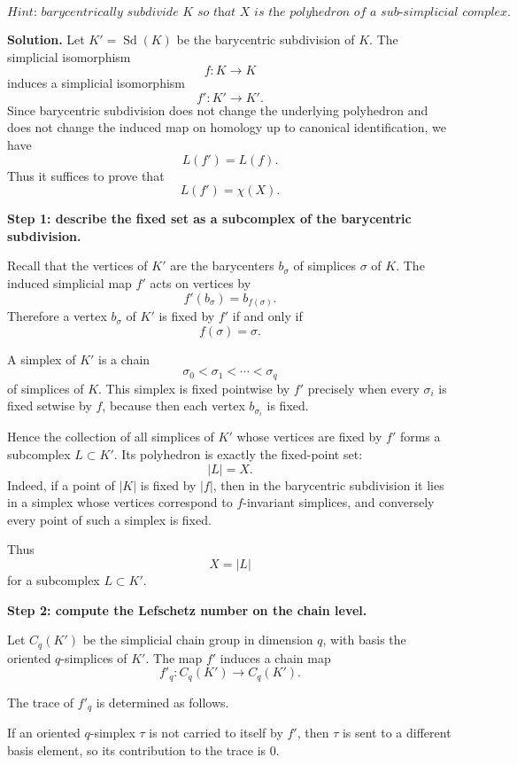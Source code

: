 \documentclass[12pt,a4paper]{article}
\theoremstyle{notespace}
\begin{document}
\[
\textit{Hint: barycentrically subdivide \(K\) so that \(X\) is the polyhedron of a sub-simplicial complex.}
\]

\bigskip

\textbf{Solution.}
Let \(K'=\operatorname{Sd}(K)\) be the barycentric subdivision of \(K\). The simplicial isomorphism
\[
f:K\to K
\]
induces a simplicial isomorphism
\[
f':K'\to K'.
\]
Since barycentric subdivision does not change the underlying polyhedron and does not change the induced map on homology up to canonical identification, we have
\[
L(f')=L(f).
\]
Thus it suffices to prove that
\[
L(f')=\chi(X).
\]

\medskip

\textbf{Step 1: describe the fixed set as a subcomplex of the barycentric subdivision.}

Recall that the vertices of \(K'\) are the barycenters \(b_\sigma\) of simplices \(\sigma\) of \(K\). The induced simplicial map \(f'\) acts on vertices by
\[
f'(b_\sigma)=b_{f(\sigma)}.
\]
Therefore a vertex \(b_\sigma\) of \(K'\) is fixed by \(f'\) if and only if
\[
f(\sigma)=\sigma.
\]

A simplex of \(K'\) is a chain
\[
\sigma_0<\sigma_1<\cdots<\sigma_q
\]
of simplices of \(K\). This simplex is fixed pointwise by \(f'\) precisely when every \(\sigma_i\) is fixed setwise by \(f\), because then each vertex \(b_{\sigma_i}\) is fixed.

Hence the collection of all simplices of \(K'\) whose vertices are fixed by \(f'\) forms a subcomplex \(L\subset K'\). Its polyhedron is exactly the fixed-point set:
\[
|L|=X.
\]
Indeed, if a point of \(|K|\) is fixed by \(|f|\), then in the barycentric subdivision it lies in a simplex whose vertices correspond to \(f\)-invariant simplices, and conversely every point of such a simplex is fixed.

Thus
\[
X=|L|
\]
for a subcomplex \(L\subset K'\).

\medskip

\textbf{Step 2: compute the Lefschetz number on the chain level.}

Let \(C_q(K')\) be the simplicial chain group in dimension \(q\), with basis the oriented \(q\)-simplices of \(K'\). The map \(f'\) induces a chain map
\[
f'_q:C_q(K')\to C_q(K').
\]

The trace of \(f'_q\) is determined as follows.

If an oriented \(q\)-simplex \(\tau\) is not carried to itself by \(f'\), then \(\tau\) is sent to a different basis element, so its contribution to the trace is \(0\).
\end{document}
